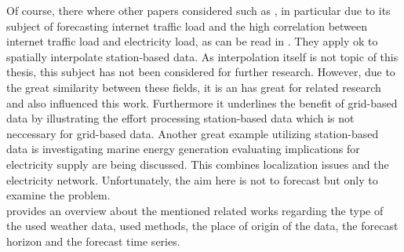 Of course, there where other papers considered such as , in particular due to its subject of forecasting internet traffic load and the high correlation between internet traffic load and electricity load, as can be read in . They apply \gls{ok} to spatially interpolate station-based data. As interpolation itself is not topic of this thesis, this subject has not been considered for further research. However, due to the great similarity between these fields, it is an has great for related research and also influenced this work. Furthermore it underlines the benefit of grid-based data by illustrating the effort processing station-based data which is not neccessary for grid-based data. Another great example utilizing station-based data is  investigating marine energy generation evaluating implications for electricity supply are being discussed. This combines localization issues and the electricity network. Unfortunately, the aim here is not to forecast but only to examine the problem.\\

 provides an overview about the mentioned related works regarding the type of the used weather data, used methods, the place of origin of the data, the forecast horizon and the forecast time series.\\

